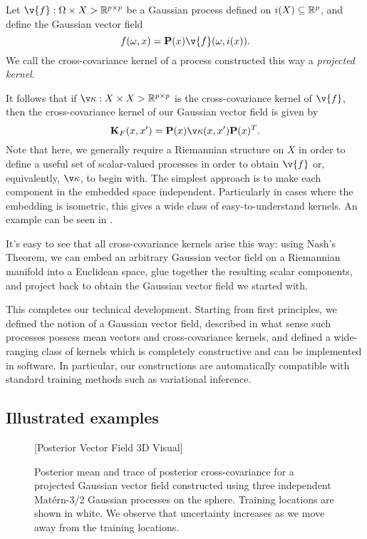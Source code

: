 \documentclass[11pt]{book}
\begin{document}
\begin{definition}
Let $\v{f} : \Omega \x X \-> \R^{p\x p}$ be a Gaussian process defined on $i(X) \subseteq \mathbb{R}^p$, and define the Gaussian vector field
\[
f(\omega, x) = \m{P}(x) \v{f}(\omega, i(x))
.
\]
We call the cross-covariance kernel of a process constructed this way a \emph{projected kernel}.
\end{definition}

It follows that if $\v\kappa : X \x X \-> \R^{p \x p}$ is the cross-covariance kernel of $\v{f}$, then the cross-covariance kernel of our Gaussian vector field is given by 
\[
\m{K}_F(x,x') = \m{P}(x) \v\kappa(x,x') \m{P}(x)^T
.    
\]
Note that here, we generally require a Riemannian structure on $X$ in order to define a useful set of scalar-valued processes in order to obtain $\v{f}$ or, equivalently, $\v\kappa$, to begin with.
The simplest approach is to make each component in the embedded space independent.
Particularly in cases where the embedding is isometric, this gives a wide class of easy-to-understand kernels.
An example can be seen in .

It's easy to see that all cross-covariance kernels arise this way: using Nash's Theorem, we can embed an arbitrary Gaussian vector field on a Riemannian manifold into a Euclidean space, glue together the resulting scalar components, and project back to obtain the Gaussian vector field we started with.

This completes our technical development. 
Starting from first principles, we defined the notion of a Gaussian vector field, described in what sense such processes possess mean vectors and cross-covariance kernels, and defined a wide-ranging class of kernels which is completely constructive and can be implemented in software.
In particular, our constructions are automatically compatible with standard training methods such as variational inference.

\subsection{Illustrated examples}

\begin{figure}
\vspace*{10ex}
[Posterior Vector Field 3D Visual]
\vspace*{10ex}
\caption{Posterior mean and trace of posterior cross-covariance for a projected Gaussian vector field constructed using three independent Matérn-3/2 Gaussian processes on the sphere. Training locations are shown in white. We observe that uncertainty increases as we move away from the training locations.}
\label{fig:posterior-vector-field}
\end{figure}
\end{document}
